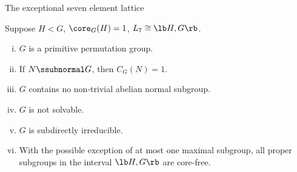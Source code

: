 \begin{frame}[fragile,label=NewConclusion,shrink=5]{The exceptional seven element lattice}
      \begin{center}
      \end{center}
    \begin{theorem}
      \label{thm:except-seven-elem}
      Suppose $H<G$, \hskip2mm $\core_G(H) = 1$, \hskip2mm $L_7 \cong \lb H,G \rb$.
      \begin{enumerate}[(i)]
      \item<1-> $G$ is a primitive permutation group.
      \item<1-> If $N\ssubnormal G$, then $C_G(N) = 1$.
      \item<1-> $G$ contains no non-trivial abelian normal subgroup.
      \item<1-> $G$ is not solvable.
      \item<1-> $G$ is subdirectly irreducible.
      \item<1-> With the possible exception of at most one maximal subgroup, %
        all proper subgroups in the interval $\lb H,G \rb$ are core-free. 
      \end{enumerate}
    \end{theorem}

\end{frame}









